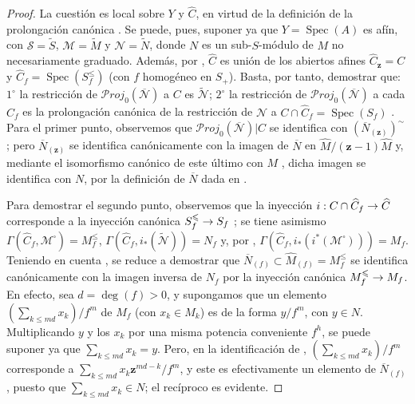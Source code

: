 \documentclass[oneside,10pt]{amsart}
\makeatletter
\renewcommand{\leq}{\leqslant}
\newcommand{\ega@arrow}[2]{\mathchoice{#1}{#2}{#2}{#2}}
\renewcommand{\to}{\ega@arrow{\longrightarrow}{\rightarrow}}
\makeatother
\begin{document}
\begin{proof}
La cuestión es local sobre $Y$ y $\widehat{C}$, en virtud de la definición de la prolongación canónica .
Se puede, pues, suponer ya que $Y=\operatorname{Spec}(A)$ es afín, con $\mathcal{S}=\widetilde{S}$, $\mathcal{M}=\widetilde{M}$ y $\mathcal{N}=\widetilde{N}$, donde $N$ es un sub-$S$-módulo de $M$ no necesariamente graduado.
Además, por , $\widehat{C}$ es unión de los abiertos afines $\widehat{C}_{\mathbf{z}}=C$ y $\widehat{C}_f=\operatorname{Spec}(S_f^{\leq})$ (con $f$ homogéneo en $S_+$).
Basta, por tanto, demostrar que: $1^\circ$ la restricción de $\mathcal{P}\mathit{roj}_0(\overline{\mathcal{N}})$ a $C$ es $\widetilde{\mathcal{N}}$; $2^\circ$ la restricción de $\mathcal{P}\mathit{roj}_0(\overline{\mathcal{N}})$ a cada $\widehat{C}_f$ es la prolongación canónica de la restricción de $\mathcal{N}$ a $C\cap\widehat{C}_f=\operatorname{Spec}(S_f)$ .
Para el primer punto, observemos que $\mathcal{P}\mathit{roj}_0(\overline{\mathcal{N}})|C$ se identifica con $(\overline{N}_{(\mathbf{z})})^{\sim}$ ;
pero $\overline{N}_{(\mathbf{z})}$ se identifica canónicamente  con la imagen de $\overline{N}$ en $\widehat{M}/(\mathbf{z}-1)\widehat{M}$ y, mediante el isomorfismo canónico de este último con $M$ , dicha imagen se identifica con $N$, por la definición de $\overline{N}$ dada en .

Para demostrar el segundo punto, observemos que la inyección $i:C\cap\widehat{C}_f\to\widehat{C}$ corresponde a la inyección canónica $S_f^{\leq}\to S_f$ ;
se tiene asimismo $\Gamma(\widehat{C}_f,\mathcal{M}^{\square})=M_f^{\leq}$, $\Gamma(\widehat{C}_f,i_*(\widetilde{\mathcal{N}}))=N_f$ y, por , $\Gamma(\widehat{C}_f,i_*(i^*(\mathcal{M}^{\square})))=M_f$.
Teniendo en cuenta , se reduce a demostrar que $\overline{N}_{(f)}\subset\widehat{M}_{(f)}=M_f^{\leq}$ se identifica canónicamente con la imagen inversa de $N_f$ por la inyección canónica $M_f^{\leq}\to M_f$.
En efecto, sea $d=\deg(f)>0$, y supongamos que un elemento $(\sum_{k\leqslant md}x_k)/f^m$ de $M_f$ (con $x_k\in M_k$) es de la forma $y/f^m$, con $y\in N$.
Multiplicando $y$ y los $x_k$ por una misma potencia conveniente $f^h$, se puede suponer ya que $\sum_{k\leqslant md}x_k=y$.
Pero, en la identificación de , $(\sum_{k\leqslant md}x_k)/f^m$ corresponde a $\sum_{k\leqslant md}x_k\mathbf{z}^{md-k}/f^m$, y este es efectivamente un elemento de $\overline{N}_{(f)}$, puesto que $\sum_{k\leqslant md}x_k\in N$;
el recíproco es evidente.
\end{proof}
\end{document}
